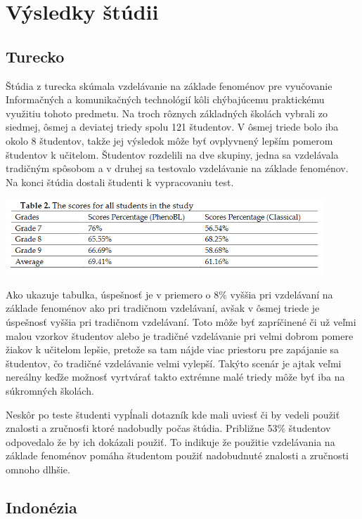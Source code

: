 \documentclass[11pt,slovak,a4paper]{article}
\begin{document}
\section{Výsledky štúdii}

\subsection{Turecko}

Štúdia z turecka \cite{jcer} skúmala vzdelávanie na základe fenoménov pre vyučovanie Informačných a komunikačných technológií
kôli chýbajúcemu praktickému využitiu tohoto predmetu. Na troch rôznych základných školách vybrali zo siedmej, ôsmej a deviatej
triedy spolu 121 študentov. V ôsmej triede bolo iba okolo 8 študentov, takže jej výsledok môže byť ovplyvnený lepším pomerom študentov
k učitelom. Študentov rozdelili na dve skupiny, jedna sa vzdelávala tradičným spôsobom a v druhej sa testovalo vzdelávanie na základe
fenoménov. Na konci štúdia dostali študenti k vypracovaniu test.

\includegraphics [width=0.9\textwidth] {table.png}

Ako ukazuje tabulka, úspešnosť je v priemero o 8\% vyššia pri vzdelávaní na základe fenoménov ako pri tradičnom vzdelávaní, avšak v 
ôsmej triede je úspešnosť vyššia pri tradičnom vzdelávaní. Toto môže byť zapríčinené či už veľmi malou vzorkov študentov alebo je
tradičné vzdelávanie pri velmi dobrom pomere žiakov k učitelom lepšie, pretože sa tam nájde viac priestoru pre zapájanie sa študentov,
čo tradičné vzdelávanie velmi vylepší. Takýto scenár je ajtak veľmi nereálny keďže možnosť vyrtvárať takto extrémne malé triedy môže byť iba
na súkromných školách.

Neskôr po teste študenti vypĺnali dotazník kde mali uviesť či by vedeli použiť znalosti a zručnosťi ktoré nadobudly počas štúdia. Približne 53\%
študentov odpovedalo že by ich dokázali použiť. To indikuje že použitie vzdelávania na základe fenoménov pomáha študentom použiť nadobudnuté 
znalosti a zručnosti omnoho dlhšie.

\subsection{Indonézia}
\end{document}
